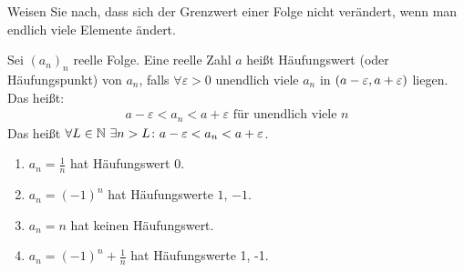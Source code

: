 \begin{uebung}
    Weisen Sie nach, dass sich der Grenzwert einer Folge nicht verändert, wenn man endlich viele Elemente ändert.
\end{uebung}

\begin{definition}[Häufungswert]
    Sei $(a_n)_n$ reelle Folge. Eine reelle Zahl $a$ heißt Häufungswert (oder Häufungspunkt) von $a_n$, falls $\forall \varepsilon >0$ unendlich viele $a_n$ in $\left(a-\varepsilon, a+\varepsilon\right)$ liegen. Das heißt:
    \begin{align*}
        a-\varepsilon < a_n < a+ \varepsilon\text{ für unendlich viele $n$}
    \end{align*}
    Das heißt $\forall L\in\mathbb{N}~\exists n> L\colon a-\varepsilon < a_n < a+\varepsilon$.
\end{definition}

\begin{beispiel}
    \theoremescape
    \begin{enumerate}
        \item $a_n=\frac{1}{n}$ hat Häufungswert 0.
        \item $a_n=(-1)^n$ hat Häufungswerte $1$, $-1$.
        \item $a_n=n$ hat keinen Häufungswert.
        \item $a_n=(-1)^n+\frac{1}{n}$ hat Häufungswerte 1, -1.
    \end{enumerate}
\end{beispiel}

